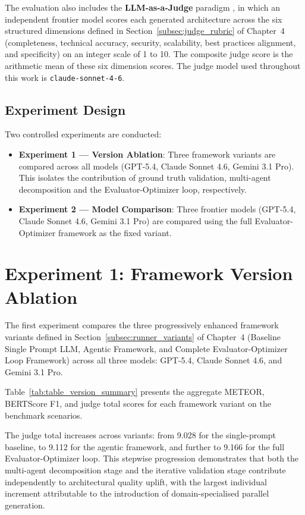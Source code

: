 The evaluation also includes the \textbf{LLM-as-a-Judge} paradigm \cite{zheng2024judging}, in which an independent frontier model scores each generated architecture across the six structured dimensions defined in Section~\ref{subsec:judge_rubric} of Chapter~4 (completeness, technical accuracy, security, scalability, best practices alignment, and specificity) on an integer scale of 1 to 10. The composite judge score is the arithmetic mean of these six dimension scores. The judge model used throughout this work is \texttt{claude-sonnet-4-6}.



\subsection{Experiment Design}

Two controlled experiments are conducted:

\begin{itemize}
    \item \textbf{Experiment 1 — Version Ablation}: Three framework variants are compared across all models (GPT-5.4, Claude Sonnet 4.6, Gemini 3.1 Pro). This isolates the contribution of ground truth validation, multi-agent decomposition and the Evaluator-Optimizer loop, respectively.
    \item \textbf{Experiment 2 — Model Comparison}: Three frontier models (GPT-5.4, Claude Sonnet 4.6, Gemini 3.1 Pro) are compared using the full Evaluator-Optimizer framework as the fixed variant.
\end{itemize}


\section{Experiment 1: Framework Version Ablation}
\label{sec:exp1}

The first experiment compares the three progressively enhanced framework variants defined in Section~\ref{subsec:runner_variants} of Chapter~4 (Baseline Single Prompt LLM, Agentic Framework, and Complete Evaluator-Optimizer Loop Framework) across all three models: GPT-5.4, Claude Sonnet 4.6, and Gemini 3.1 Pro.



 Table~\ref{tab:table_version_summary} presents the aggregate METEOR, BERTScore F1, and judge total scores for each framework variant on the benchmark scenarios. 

The judge total increases across variants: from 9.028 for the single-prompt baseline, to 9.112 for the agentic framework, and further to 9.166 for the full Evaluator-Optimizer loop. This stepwise progression demonstrates that both the multi-agent decomposition stage and the iterative validation stage contribute independently to architectural quality uplift, with the largest individual increment attributable to the introduction of domain-specialised parallel generation.

